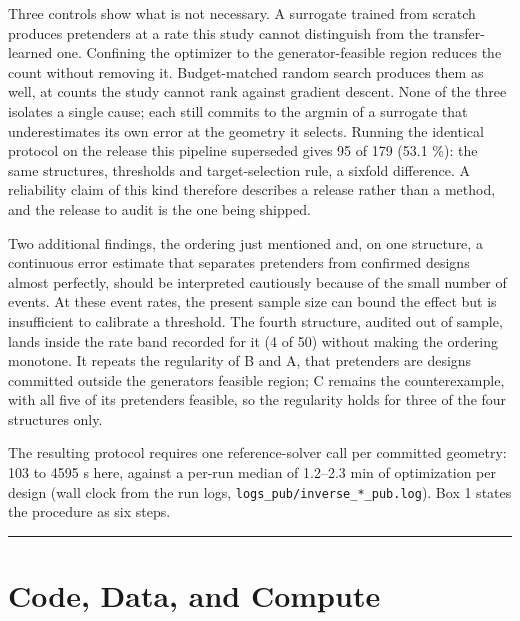\documentclass[11pt,a4paper]{article}
\begin{document}
Three controls show what is not necessary. A surrogate trained from scratch produces
pretenders at a rate this study cannot distinguish from the transfer-learned one. Confining
the optimizer to the generator-feasible region reduces the count without removing it.
Budget-matched random search produces them as well, at counts the study cannot rank against
gradient descent. None of the three isolates a single cause; each still commits to the argmin of a surrogate that underestimates its own error at the geometry it selects. Running the identical protocol on the release this pipeline superseded gives 95 of 179 (53.1 \%): the same structures,
thresholds and target-selection rule, a sixfold difference. A reliability claim of this
kind therefore describes a release rather than a method, and the release to audit is the one being shipped.

Two additional findings, the ordering just mentioned and, on one structure, a continuous error estimate that separates pretenders from confirmed designs almost perfectly, should be interpreted cautiously because of the small number of events. At these event rates, the present sample size can bound the effect but is insufficient to calibrate a threshold. The fourth structure, audited out of sample, lands inside the
rate band recorded for it (4 of 50) without making the ordering monotone. It repeats the
regularity of B and A, that pretenders are designs committed outside the generator\textquotesingle s
feasible region; C remains the counterexample, with all five of its pretenders feasible, so the regularity holds for three of the four structures only.

The resulting protocol requires one reference-solver call per committed geometry: 103 to 4595 s here, against a per-run median of 1.2--2.3 min of optimization per design (wall clock from the run logs, \texttt{logs\_\allowbreak{}pub/\allowbreak{}inverse\_\allowbreak{}*\_\allowbreak{}pub.\allowbreak{}log}). Box 1 states the procedure as six steps.

\begin{center}\rule{0.5\linewidth}{0.5pt}\end{center}

\section*{Code, Data, and Compute}
\end{document}
